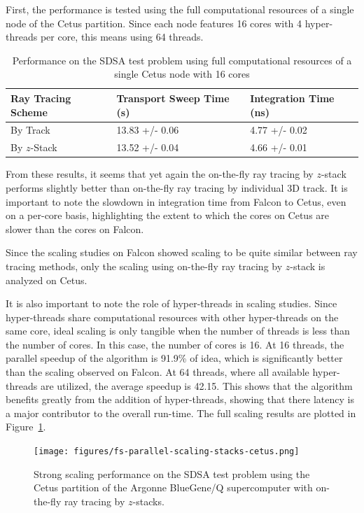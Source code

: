 First, the performance is tested using the full computational resources of a single node of the Cetus partition. Since each node features 16 cores with 4 hyper-threads per core, this means using 64 threads. 

\begin{table}[ht]
	\centering
	\caption{Performance on the SDSA test problem using full computational resources of a single Cetus node with 16 cores}
	\medskip
	\begin{tabular}{l|l|l}
		\hline
		Ray Tracing Scheme & Transport Sweep Time (s) & Integration Time (ns) \\
		\hline
		By Track & 13.83 +/- 0.06 & 4.77 +/- 0.02 \\
		By $z$-Stack & 13.52 +/- 0.04 & 4.66 +/- 0.01 \\
		\hline
	\end{tabular}
	\label{tab:rt-full-thread-cetus}
\end{table}

From these results, it seems that yet again the on-the-fly ray tracing by $z$-stack performs slightly better than on-the-fly ray tracing by individual 3D track. It is important to note the slowdown in integration time from Falcon to Cetus, even on a per-core basis, highlighting the extent to which the cores on Cetus are slower than the cores on Falcon. 

Since the scaling studies on Falcon showed scaling to be quite similar between ray tracing methods, only the scaling using on-the-fly ray tracing by $z$-stack is analyzed on Cetus. 

It is also important to note the role of hyper-threads in scaling studies. Since hyper-threads share computational resources with other hyper-threads on the same core, ideal scaling is only tangible when the number of threads is less than the number of cores. In this case, the number of cores is 16. At 16 threads, the parallel speedup of the algorithm is 91.9\% of idea, which is significantly better than the scaling observed on Falcon. At 64 threads, where all available hyper-threads are utilized, the average speedup is 42.15. This shows that the algorithm benefits greatly from the addition of hyper-threads, showing that there latency is a major contributor to the overall run-time. The full scaling results are plotted in Figure~\ref{fig:rt-parallel-fs-cetus}.

\begin{figure}[ht!]
	\centering
	\texttt{[image: figures/fs-parallel-scaling-stacks-cetus.png]}
	\caption{Strong scaling performance on the SDSA test problem using the Cetus partition of the Argonne BlueGene/Q supercomputer with on-the-fly ray tracing by $z$-stacks.}
	\label{fig:rt-parallel-fs-cetus}
\end{figure}


